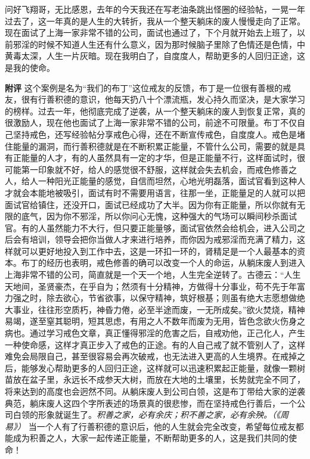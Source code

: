 \begin{case}
    问好飞翔哥，无比感恩，去年的今天我还在写老油条跳出怪圈的经验帖，一晃一年过去了，这一年真的是人生的大转折，我从一个整天躺床的废人慢慢走向了正常。现在面试了上海一家非常不错的公司，面试也通过了，下个月就开始去上班了，以前邪淫的时候不知道人生还有什么意义，因为那时候脑子里除了色情还是色情，中黄毒太深，人生一片灰暗。现在我明白了，自度度人，帮助更多的人回归正途，这是我的使命。

    \textbf{附评} 这个案例是名为“我们的布丁”这位戒友的反馈，布丁是一位很有善根的戒友，很有行善积德的意识，他每天扔八十个漂流瓶，发心持久而坚决，是大家学习的榜样。过去一年，他彻底完成了逆袭，从一个整天躺床的废人到恢复正常，真的很激励人，现在他也面试了上海一家非常不错的公司，前途不可限量。布丁不仅自己坚持戒色，还写经验帖分享戒色心得，还在不断宣传戒色，自度度人。戒色是堵住能量的漏洞，而行善积德就是在不断积累正能量，不管什么公司，需要的就是具有正能量的人才，有的人虽然具有一定的才华，但是正能量不行，这样面试时，很可能第一印象就不好，给人的感觉很不舒服，这样就会失去机会，而戒色修善之人，给人一种阳光正能量的感觉，自信而坦然，心地光明磊落，面试官看到这种人才就会本能地被吸引，面试有时不需要用语言，往那一坐，正能量足的人就可以把面试官给镇住，还没开口，面试已经成功了大半。因为你有正能量，所以你就有无限的底气，因为你不邪淫，所以你问心无愧，这种强大的气场可以瞬间秒杀面试官。有的人虽然能力不大行，但只要正能量够，面试官依然会给机会，进入公司之后会有培训，领导会把你当做人才来进行培养，而你因为戒邪淫而充满了精力，这样就可以更好地投入到工作中去，这是一环扣一环的，肾精足是一个人最基本的资本。布丁的经历也表明，戒色修善的确可以改变一个人的命运，从躺床废人到进入上海非常不错的公司，简直就是一个天一个地，人生完全逆转了。古德云：“人生天地间，圣贤豪杰，在乎自为；然须有十分精神，方做得十分事业，苟不先于年富力强之时，除去欲心，节省欲事，以保守精神，筑好根基；则虽有绝大志愿想做绝大事业，往往形空质朽，神昏力倦，必至半途而废，一无所成矣。”欲火焚烧，精神易竭，遂至窒其聪明，短其思虑，有用之人不数年而废为无用，皆色念欲火伤身之病也。通过学习戒色文章，真正懂得邪淫的危害之后，自戒劝他，正己化人，产生一种使命感，这样才真正步入了戒色的正途。有的人自己戒了就不管别人了，这样难免会局限自己，甚至很容易会再次破戒，也无法进入更高的人生境界。在戒掉之后，能够发心帮助更多的人回归正途，这样就可以迅速积累起正能量，就像一颗树苗放在盆子里，永远长不成参天大树，而放在大地的土壤里，长势就完全不同了，将来达到的高度也会迥然不同。从躺床废人到公司白领，这是布丁带给大家的逆袭典范，躺床废人这四个字所表述的场景真的很悲惨，而在坚持戒色行善后，一个公司白领的形象就诞生了。\textit{积善之家，必有余庆；积不善之家，必有余殃。（《周易》）} 当一个人有了行善积德的意识后，他的人生就会完全改变，希望每位戒友都能成为积善之人，大家一起传递正能量，不断帮助更多的人，这是我们共同的使命！
\end{case}

